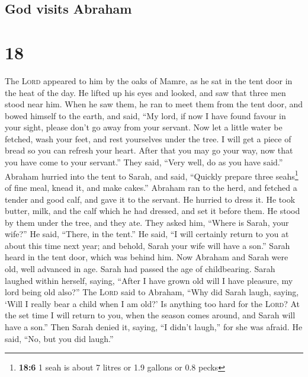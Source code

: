 \hypertarget{god-visits-abraham}{%
\subsection{God visits Abraham}\label{god-visits-abraham}}

\hypertarget{section-17}{%
\section{18}\label{section-17}}

 The \textsc{Lord} appeared to him by the oaks of Mamre,
as he sat in the tent door in the heat of the day.  He
lifted up his eyes and looked, and saw that three men stood near him.
When he saw them, he ran to meet them from the tent door, and bowed
himself to the earth,  and said, ``My lord, if now I have
found favour in your sight, please don't go away from your servant.
 Now let a little water be fetched, wash your feet, and
rest yourselves under the tree.  I will get a piece of
bread so you can refresh your heart. After that you may go your way, now
that you have come to your servant.'' They said, ``Very well, do as you
have said.''  Abraham hurried into the tent to Sarah, and
said, ``Quickly prepare three seahs\footnote{\textbf{18:6} 1 seah is
  about 7 litres or 1.9 gallons or 0.8 pecks} of fine meal, knead it,
and make cakes.''  Abraham ran to the herd, and fetched a
tender and good calf, and gave it to the servant. He hurried to dress
it.  He took butter, milk, and the calf which he had
dressed, and set it before them. He stood by them under the tree, and
they ate.  They asked him, ``Where is Sarah, your wife?''
He said, ``There, in the tent.''  He said, ``I will
certainly return to you at about this time next year; and behold, Sarah
your wife will have a son.'' Sarah heard in the tent door, which was
behind him.  Now Abraham and Sarah were old, well
advanced in age. Sarah had passed the age of childbearing.
 Sarah laughed within herself, saying, ``After I have
grown old will I have pleasure, my lord being old also?''
 The \textsc{Lord} said to Abraham, ``Why did Sarah
laugh, saying, `Will I really bear a child when I am old?'
 Is anything too hard for the \textsc{Lord}? At the set
time I will return to you, when the season comes around, and Sarah will
have a son.''  Then Sarah denied it, saying, ``I didn't
laugh,'' for she was afraid. He said, ``No, but you did laugh.''

